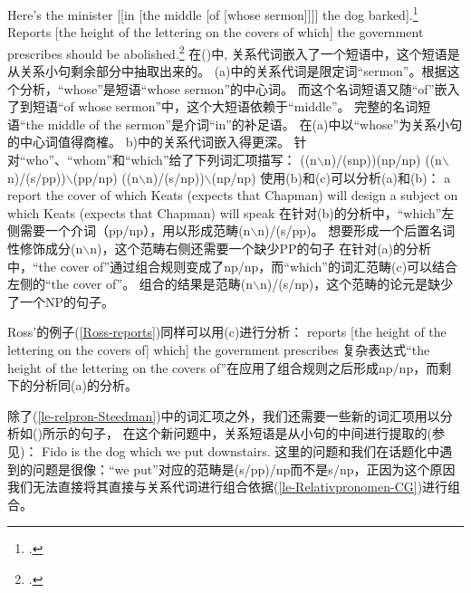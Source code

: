 \eal
\ex\label{Beispiel-Minister}
Here's the minister [[in [the middle [of [whose sermon]]]] the dog barked].\footnote{
.
}
\ex Reports [the height of the lettering on the covers of which] the government prescribes should be
abolished.\label{Ross-reports}\footnote{
.\nocite{Ross86a-u}
}
\zl
在()中, 关系代词嵌入了一个短语中，这个短语是从关系小句剩余部分中抽取出来的。
(a)中的关系代词是限定词``sermon''。根据这个分析，``{whose}''是短语``{whose sermon}''的中心词。
而这个名词短语又随``{of}''嵌入了到短语``{of whose sermon}''中，这个大短语依赖于``{middle}''。
完整的名词短语``{the middle of the sermon}''是介词``{in}''的补足语。
在(a)中以``{whose}''为关系小句的中心词值得商榷。
b)中的关系代词嵌入得更深。
\citet[]{Steedman97a}针对``{who}''、``{whom}''和``{which}''给了下列词汇项描写：
\eal
\label{le-relpron-Steedman}
\settowidth{}
\ex ((n$\backslash$n)/(s\bs np))\bs (np/np)       
\ex ((n$\backslash$n)/(s/pp))$\backslash$(pp/np)  
\ex ((n$\backslash$n)/(s/np))$\backslash$(np/np)  
\zl
使用(b)和(c)可以分析(a)和(b)：
\eal
\ex a report the cover of which Keats (expects that Chapman) will design
\ex a subject on which Keats (expects that Chapman) will speak
\zl
在针对(b)的分析中，``{which}''左侧需要一个介词（pp/np），用以形成范畴(n$\backslash$n)/(s/pp)。
想要形成一个后置名词性修饰成分(n$\backslash$n)，这个范畴右侧还需要一个缺少PP的句子
在针对(a)的分析中，``{the cover of}''通过组合规则变成了np/np，而``{which}''的词汇范畴(c)可以结合左侧的``{the cover of}''。
组合的结果是范畴(n$\backslash$n)/(s/np)，这个范畴的论元是缺少了一个NP的句子。

Ross'的例子(\ref{Ross-reports})同样可以用(c)进行分析：
\ea
reports [the height of the lettering on the covers of]
which] the government prescribes
\z
复杂表达式``{the height of the lettering on the covers of}''在应用了组合规则之后形成np/np，而剩下的分析同(a)的分析。

除了(\ref{le-relpron-Steedman})中的词汇项之外，我们还需要一些新的词汇项用以分析如()所示的句子，
在这个新问题中，关系短语是从小句的中间进行提取的(参见\citealp[]{Pollard88a})：
\ea
Fido is the dog which we put downstairs.
\z
这里的问题和我们在话题化中遇到的问题是很像：``{we put}''对应的范畴是(s/pp)/np而不是s/np，正因为这个原因我们无法直接将其直接与关系代词进行组合依据(\ref{le-Relativpronomen-CG})进行组合。
\pagebreak

